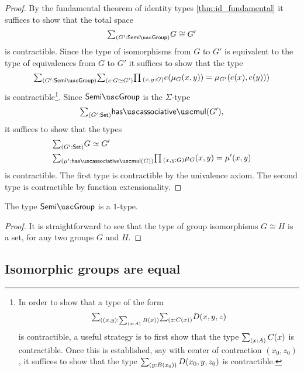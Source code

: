 \begin{proof}
By the fundamental theorem of identity types \cref{thm:id_fundamental} it suffices to show that the total space
\begin{equation*}
\sm{G':\semigroup}G\cong G'
\end{equation*}
is contractible. Since the type of isomorphisms from $G$ to $G'$ is equivalent to the type of equivalences from $G$ to $G'$ it suffices to show that the type
\begin{equation*}
  \sm{G':\semigroup}\sm{e:\eqv{G}{G'}}\prd{x,y:G}e(\mu_G(x,y))=\mu_{G'}(e(x),e(y)))
\end{equation*}
is contractible\footnote{In order to show that a type of the form
  \begin{equation*}
    \sm{(x,y):\sm{x:A}B(x)}\sm{z:C(x)}D(x,y,z)
  \end{equation*}
  is contractible, a useful strategy is to first show that the type $\sm{x:A}C(x)$ is contractible. Once this is established, say with center of contraction $(x_0,z_0)$, it suffices to show that the type $\sm{y:B(x_0)}D(x_0,y,z_0)$ is contractible.}. Since $\semigroup$ is the $\Sigma$-type
\begin{equation*}
  \sm{G':\Set}\hasassociativemul(G'),
\end{equation*}
it suffices to show that the types
\begin{align*}
  & \sm{G':\Set}\eqv{G}{G'} \\
  & \sm{\mu':\hasassociativemul(G)}\prd{x,y:G}\mu_G(x,y)=\mu'(x,y)
\end{align*}
is contractible. The first type is contractible by the univalence axiom. The second type is contractible by function extensionality.
\end{proof}

\begin{cor}
The type $\semigroup$ is a $1$-type.
\end{cor}

\begin{proof}
It is straightforward to see that the type of group isomorphisms $G\cong H$ is a set, for any two groups $G$ and $H$.
\end{proof}

\subsection{Isomorphic groups are equal}

